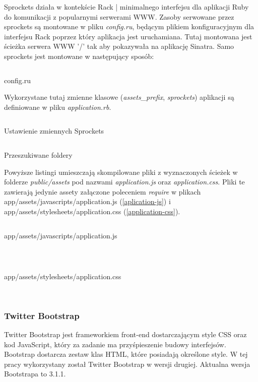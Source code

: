 \documentclass[11pt,a4paper, twoside]{article}
\begin{document}
Sprockets działa w kontekście Rack | minimalnego interfejsu dla aplikacji Ruby do komunikacji z popularnymi serwerami WWW. Zasoby serwowane przez sprockets są montowane w pliku \emph{config.ru}, będącym plikiem konfiguracyjnym dla interfejsu Rack poprzez który aplikacja jest uruchamiana. Tutaj  montowana jest ścieżka serwera WWW '/' tak aby pokazywała na aplikację Sinatra. 
\noindent
Samo sprockets jest montowane w następujący sposób:
\begin{listing}[H]
\inputminted[linenos=true]{ruby}{./src/sprockets_mount.rb}
\caption{config.ru}
\end{listing}
Wykorzystane tutaj zmienne klasowe (\emph{assets\_prefix}, \emph{sprockets}) aplikacji są definiowane w pliku \emph{application.rb}.
\begin{listing}[H]
\inputminted[linenos=true]{ruby}{./src/sprockets_config.rb}
\caption{Ustawienie zmiennych Sprockets}
\end{listing}
\noindent
\begin{listing}[H]
\inputminted[linenos=true]{ruby}{./src/sprockets_asset_paths.rb}
\caption{Przeszukiwane foldery}
\end{listing}
Powyższe listingi umieszczają skompilowane pliki z wyznaczonych ścieżek w folderze \emph{public/assets} pod nazwami \emph{application.js} oraz \emph{application.css}. Pliki te zawierają jedynie assety załączone poleceniem \emph{require} w plikach app/assets/javascripts/application.js (\ref{aplication-js}) i \newline app/assets/stylesheets/application.css (\ref{application-css}).
\begin{listing}[H]
\inputminted[linenos=true]{javascript}{./src/application.js}
\caption{app/assets/javascripts/application.js}
$\label{aplication-js}$
\end{listing}
\begin{listing}[H]
\inputminted[linenos=true]{javascript}{./src/application.css}
\caption{app/assets/stylesheets/application.css}
$\label{application-css}$
\end{listing}
\subsubsection{Twitter Bootstrap}
Twitter Bootstrap jest frameworkiem front-end dostarczającym style CSS oraz kod JavaScript, który za zadanie ma przyśpieszenie budowy interfejsów. Bootstrap dostarcza zestaw klas HTML, które posiadają określone style. W tej pracy wykorzystany został Twitter Bootstrap w wersji drugiej. Aktualna wersja Bootstrapa to 3.1.1.
\end{document}
